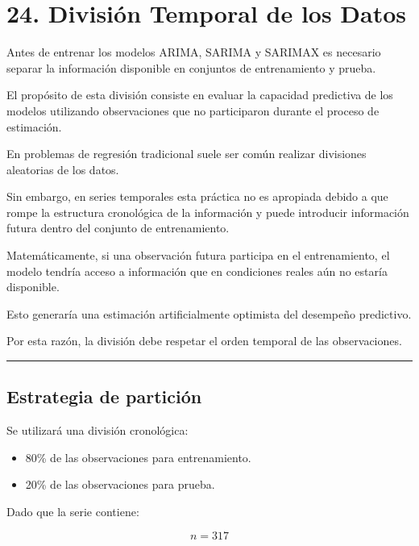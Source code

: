 \documentclass[11pt]{article}
\providecommand{\tightlist}{%
      \setlength{\itemsep}{0pt}\setlength{\parskip}{0pt}}
\begin{document}
    \hypertarget{divisiuxf3n-temporal-de-los-datos}{%
\section{24. División Temporal de los
Datos}\label{divisiuxf3n-temporal-de-los-datos}}

Antes de entrenar los modelos ARIMA, SARIMA y SARIMAX es necesario
separar la información disponible en conjuntos de entrenamiento y
prueba.

El propósito de esta división consiste en evaluar la capacidad
predictiva de los modelos utilizando observaciones que no participaron
durante el proceso de estimación.

En problemas de regresión tradicional suele ser común realizar
divisiones aleatorias de los datos.

Sin embargo, en series temporales esta práctica no es apropiada debido a
que rompe la estructura cronológica de la información y puede introducir
información futura dentro del conjunto de entrenamiento.

Matemáticamente, si una observación futura participa en el
entrenamiento, el modelo tendría acceso a información que en condiciones
reales aún no estaría disponible.

Esto generaría una estimación artificialmente optimista del desempeño
predictivo.

Por esta razón, la división debe respetar el orden temporal de las
observaciones.

\begin{center}\rule{0.5\linewidth}{0.5pt}\end{center}

\hypertarget{estrategia-de-particiuxf3n}{%
\subsection{Estrategia de partición}\label{estrategia-de-particiuxf3n}}

Se utilizará una división cronológica:

\begin{itemize}
\tightlist
\item
  80\% de las observaciones para entrenamiento.
\item
  20\% de las observaciones para prueba.
\end{itemize}

Dado que la serie contiene:

\[
n = 317
\]
\end{document}
